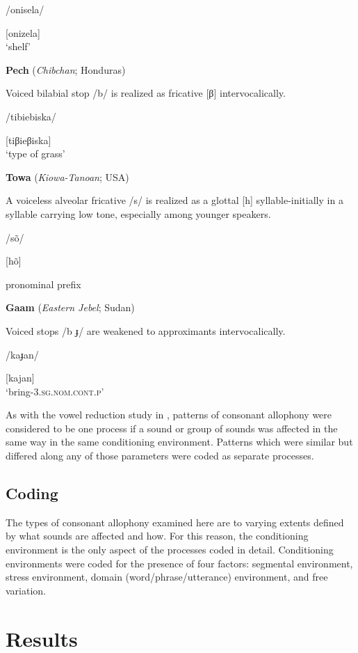 /onisela/

[onizela]\\
\glt ‘shelf’
\citep[30-1]{Bonvillain1973}
\z

\ea\label{ex:7.15}
  \textbf{Pech} (\textit{Chibchan}; Honduras)

Voiced bilabial stop /b/ is realized as fricative [β] intervocalically.

/tibiebiska/

[tiβieβiska]\\
\glt ‘type of grass’
\citep[16]{Holt1999}
\z

\ea\label{ex:7.16}
  \textbf{Towa} (\textit{Kiowa-Tanoan}; USA)

A voiceless alveolar fricative /s/ is realized as a glottal [h] syllable-initially in a syllable carrying low tone, especially among younger speakers.

/sõ/

[hõ]

pronominal prefix
\citep[13]{Yumitani1998}
\z

\ea\label{ex:7.17}
  \textbf{Gaam} (\textit{Eastern Jebel}; Sudan)

Voiced stops /b ɟ/ are weakened to approximants intervocalically.

/kaɟan/

[kajan]\\
\glt ‘bring-3.\textsc{sg.nom.cont.p}’
\citep[24-5]{Stirtz2011}
\z

  As with the vowel reduction study in , patterns of consonant allophony were considered to be one process if a sound or group of sounds was affected in the same way in the same conditioning environment. Patterns which were similar but differed along any of those parameters were coded as separate processes.

\subsection{Coding}\label{sec:7.2.2}

  The types of consonant allophony examined here are to varying extents defined by what sounds are affected and how. For this reason, the conditioning environment is the only aspect of the processes coded in detail. Conditioning environments were coded for the presence of four factors: segmental environment, stress environment, domain (word/phrase/utterance) environment, and free variation.

\section{Results}\label{sec:7.3}
